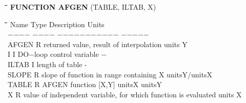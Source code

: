 \documentclass[11pt]{article}
\begin{document}
\bigskip
\nwln
\begin{tabbing}
\hspace{1.27cm}\=\hspace{1.27cm}\=\hspace{1.27cm}\=\hspace{1.27cm}\=%
\hspace{1.27cm}\=\hspace{1.27cm}\=\hspace{1.27cm}\=\hspace{1.27cm}\=%
\hspace{1.27cm}\=\hspace{1.27cm}\=\kill
{\bf FUNCTION AFGEN} \> \> \> (TABLE, ILTAB, X)
\end{tabbing}
\nwln
\begin{tabbing}
\hspace{1.27cm}\=\hspace{1.27cm}\=\hspace{1.27cm}\=\hspace{1.27cm}\=%
\hspace{1.27cm}\=\hspace{1.27cm}\=\hspace{1.27cm}\=\hspace{1.27cm}\=%
\hspace{1.27cm}\=\hspace{1.27cm}\=\kill
Name    \> \> Type   \> Description                                        \> \> \> \> \> \> \> Units\\
$-$$-$$-$$-$    \> \> $-$$-$$-$$-$   \> $-$$-$$-$$-$$-$$-$$-$$-$$-$$-$$-$                                        \> \> \> \> \> \> \> $-$$-$$-$$-$$-$\\
AFGEN   \> \> R   \> returned value, result of interpolation            \> \> \> \> \> \> \> units Y\\
I       \> \> I   \> DO$-$loop control variable                           \> \> \> \> \> \> \> $-$\\
ILTAB\> \> I\> length of table\> \> \> \> \> \> \> -\\
SLOPE   \> \> R   \> slope of function in range containing X            \> \> \> \> \> \> \> unitsY/unitsX\\
TABLE   \> \> R   \> AFGEN function [X,Y]\> \> \> \> \> \> \> unitsX unitsY\\
X       \> \> R   \> value of independent variable, for which function is evaluated\> \> \> \> \> \> \> units X
\end{tabbing}
\end{document}
